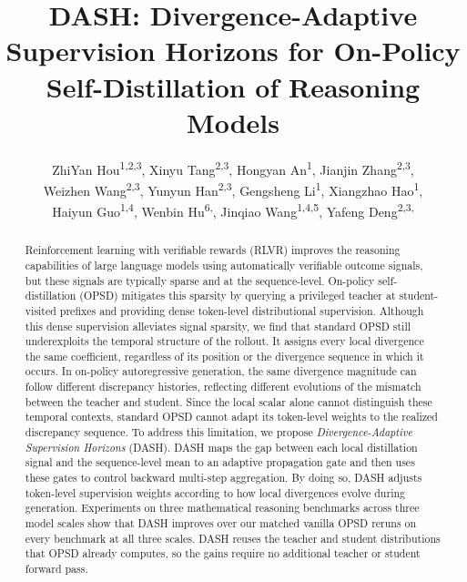 \documentclass[letterpaper]{article} %
\title{DASH: Divergence-Adaptive Supervision Horizons for On-Policy Self-Distillation of Reasoning Models}
\author{
    ZhiYan Hou\equalcontrib\textsuperscript{\rm 1,\rm 2,\rm 3},
    Xinyu Tang\equalcontrib\textsuperscript{\rm 2,\rm 3},
    Hongyan An\textsuperscript{\rm 1},
    Jianjin Zhang\textsuperscript{\rm 2,\rm 3},\\
    Weizhen Wang\textsuperscript{\rm 2,\rm 3},
    Yunyun Han\textsuperscript{\rm 2,\rm 3},
    Gengsheng Li\textsuperscript{\rm 1},
    Xiangzhao Hao\textsuperscript{\rm 1},\\
    Haiyun Guo\textsuperscript{\rm 1,\rm 4},
    Wenbin Hu\textsuperscript{\rm 6,\rm \dag},
    Jinqiao Wang\textsuperscript{\rm 1,\rm 4,\rm 5},
    Yafeng Deng\textsuperscript{\rm 2,\rm 3,\rm \dag}
}
\begin{document}
\maketitle

\begin{abstract}

Reinforcement learning with verifiable rewards (RLVR) improves the reasoning capabilities of large language models using automatically verifiable outcome signals, but these signals are typically sparse and at the sequence-level. On-policy self-distillation (OPSD) mitigates this sparsity by querying a privileged teacher at student-visited prefixes and providing dense token-level distributional supervision. Although this dense supervision alleviates signal sparsity, we find that standard OPSD still underexploits the temporal structure of the rollout. It assigns every local divergence the same coefficient, regardless of its position or the divergence sequence in which it occurs. In on-policy autoregressive generation, the same divergence magnitude can follow different discrepancy histories, reflecting different evolutions of the mismatch between the teacher and student. Since the local scalar alone cannot distinguish these temporal contexts, standard OPSD cannot adapt its token-level weights to the realized discrepancy sequence. To address this limitation, we propose \emph{Divergence-Adaptive Supervision Horizons} (DASH). DASH maps the gap between each local distillation signal and the sequence-level mean to an adaptive propagation gate and then uses these gates to control backward multi-step aggregation. By doing so, DASH adjusts token-level supervision weights according to how local divergences evolve during generation. Experiments on three mathematical reasoning benchmarks across three model scales show that DASH improves over our matched vanilla OPSD reruns on every benchmark at all three scales. DASH reuses the teacher and student distributions that OPSD already computes, so the gains require no additional teacher or student forward pass.

\end{abstract}
\end{document}
